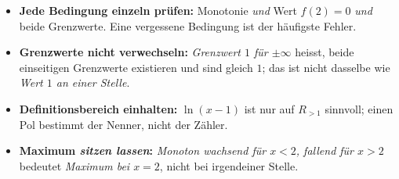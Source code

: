 \begin{achtung}
\begin{itemize}
  \item \textbf{Jede Bedingung einzeln prüfen:} Monotonie \emph{und} Wert
        $f(2)=0$ \emph{und} beide Grenzwerte. Eine vergessene Bedingung ist
        der häufigste Fehler.
  \item \textbf{Grenzwerte nicht verwechseln:} \emph{Grenzwert $1$ für
        $\pm\infty$} heisst, beide einseitigen Grenzwerte existieren und
        sind gleich $1$; das ist nicht dasselbe wie \emph{Wert $1$ an einer
        Stelle}.
  \item \textbf{Definitionsbereich einhalten:} $\ln(x-1)$ ist nur auf
        $R_{>1}$ sinnvoll; einen Pol bestimmt der Nenner, nicht der Zähler.
  \item \textbf{Maximum \emph{sitzen lassen}:} \emph{Monoton wachsend für $x<2$,
        fallend für $x>2$} bedeutet \emph{Maximum bei $x=2$}, nicht bei
        irgendeiner Stelle.
\end{itemize}
\end{achtung}
